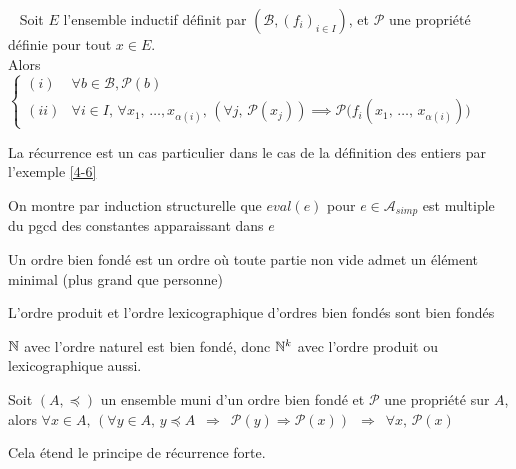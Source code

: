 \begin{theorem}~
	Soit $E$ l'ensemble inductif définit par $(\mathcal B, (f_i)_{i\in I})$, et $\mathcal P$ une propriété définie pour tout $x\in E$.\\
	
	Alors $\left\{ \begin{array}{cl}
		(i) & \forall b \in \mathcal B, \mathcal P(b)\\
		(ii) & \forall i \in I, \, \forall x_1, \, \dots, x_{\alpha(i)}, \, \left( \forall j, \, \mathcal P(x_j)\right) \implies \mathcal P \big( f_i(x_1, \, \dots, \, x_{\alpha(i)})\big)
	\end{array} \right.$	
\end{theorem}

\begin{rem}
	La récurrence est un cas particulier dans le cas de la définition des entiers par l'exemple \ref{4-6}
\end{rem}

\begin{example}
	On montre par induction structurelle que $eval(e)$ pour $e \in \mathcal A_{simp}$ est multiple du pgcd des constantes apparaissant dans $e$
\end{example}

\begin{definition}
	Un ordre bien fondé est un ordre où toute partie non vide admet un élément minimal (plus grand que personne)
\end{definition}

\begin{proposition}
	L'ordre produit et l'ordre lexicographique d'ordres bien fondés sont bien fondés
\end{proposition}

\begin{example}
	$\mathbb{N}$ avec l'ordre naturel est bien fondé, donc $\mathbb{N}^k$ avec l'ordre produit ou lexicographique aussi.
\end{example}

\begin{theorem}
	Soit $(A, \preceq)$ un ensemble muni d'un ordre bien fondé et $\mathcal P$ une propriété sur $A$, alors $\forall x \in A, \, (\forall y \in A, \, y \preceq A \enspace \Rightarrow \enspace \mathcal P(y) \Rightarrow \mathcal P(x)) \enspace \Rightarrow \enspace \forall x ,\, \mathcal P(x)$
\end{theorem}

\begin{rem}
	Cela étend le principe de récurrence forte.
\end{rem}

